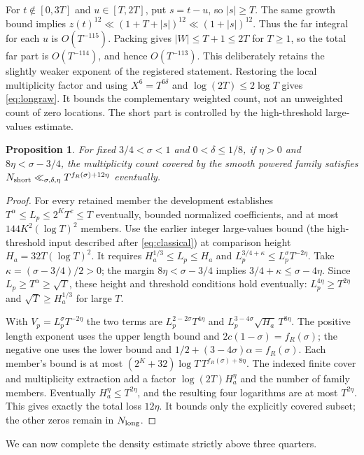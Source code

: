 \documentclass[11pt,a4paper,oneside]{article}
\newtheorem{proposition}[theorem]{Proposition}
\theoremstyle{definition}
\numberwithin{equation}{section}
\begin{document}
For $t\notin[0,3T]$ and $u\in[T,2T]$, put $s=t-u$, so $|s|\ge T$. The same growth bound implies $z(t)^{12}\ll(1+T+|s|)^{12}\ll(1+|s|)^{12}$. Thus the far integral for each $u$ is $O(T^{-115})$. Packing gives $|W|\le T+1\le2T$ for $T\ge1$, so the total far part is $O(T^{-114})$, and hence $O(T^{-113})$. This deliberately retains the slightly weaker exponent of the registered statement. Restoring the local multiplicity factor and using $X^6=T^{6\delta}$ and $\log(2T)\le2\log T$ gives \eqref{eq:longraw}. It bounds the complementary weighted count, not an unweighted count of zero locations.
The short part is controlled by the high-threshold large-values estimate.
\begin{proposition}\label{prop:strongshort}
For fixed $3/4<\sigma<1$ and $0<\delta\le1/8$, if $\eta>0$ and $8\eta<\sigma-3/4$, the multiplicity count
covered by the smooth powered family satisfies
$N_{\rm short}\ll_{\sigma,\delta,\eta}T^{f_R(\sigma)+12\eta}$ eventually.
\end{proposition}
\begin{proof}
For every retained member the development establishes
$T^\alpha\le L_p\le2^KT^c\le T$ eventually, bounded normalized
coefficients, and at most $144K^2(\log T)^2$ members.
Use the earlier integer large-values bound (the high-threshold
input described after \eqref{eq:classical}) at comparison height
$H_a=32T(\log T)^2$. It requires $H_a^{1/3}\le L_p\le H_a$ and
$L_p^{3/4+\kappa}\le L_p^\sigma T^{-2\eta}$.
Take $\kappa=(\sigma-3/4)/2>0$; the margin $8\eta<\sigma-3/4$ implies
$3/4+\kappa\le\sigma-4\eta$. Since $L_p\ge T^\alpha\ge\sqrt T$,
these height and threshold conditions hold eventually: $L_p^{4\eta}\ge T^{2\eta}$ and $\sqrt T\ge H_a^{1/3}$ for large $T$.

With $V_p=L_p^\sigma T^{-2\eta}$ the two terms are
$L_p^{2-2\sigma}T^{4\eta}$ and
$L_p^{3-4\sigma}\sqrt{H_a}\,T^{8\eta}$.
The positive length exponent uses the upper length bound and
$2c(1-\sigma)=f_R(\sigma)$; the negative one uses the lower bound and
$1/2+(3-4\sigma)\alpha=f_R(\sigma)$.
Each member's bound is at most
$(2^K+32)\log T\,T^{f_R(\sigma)+8\eta}$.
The indexed finite cover and multiplicity extraction add a factor
$\log(2T)H_a^\eta$ and the number of family members.
Eventually $H_a^\eta\le T^{2\eta}$, and the resulting four logarithms
are at most $T^{2\eta}$. This gives exactly the total loss $12\eta$.
It bounds only the explicitly covered subset; the other zeros remain in
$N_{\rm long}$.
\end{proof}
We can now complete the density estimate strictly above three quarters.
\end{document}
